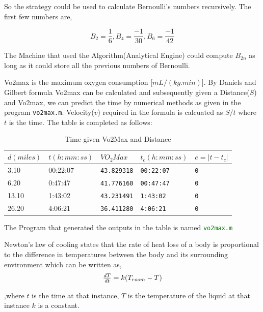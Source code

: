\documentclass[fleqn,letterpaper,12pt]{report}
\begin{document}
So the strategy could be used to calculate Bernoulli's numbers recursively. The first few numbers are,

$$ B_2 = \frac{1}{6}, B_4 = \frac{-1}{30}, B_6 = \frac{-1}{42}$$

The Machine that used the Algorithm(Analytical Engine) could compute $B_{2n}$ as long as it could store all the previous numbers of Bernoulli.\cite{lll}
%
\newpage
{}
{}
\problem
Vo2max is the maximum oxygen consumption [$mL/(kg.min)$]. By Daniels and Gilbert formula Vo2max can be calculated and subsequently given a Distance($S$) and Vo2max, we can predict the time by numerical methods as given in the program {\tt vo2max.m}. Velocity{($v$)} required in the formula is calcuated as {$S/t$} where {$ t $} is the time. The table is completed as follows:
\begin{table}[h]
\centering
\caption{Time given Vo2Max and Distance}
\label{my-label}
\begin{tabular}{|l|l|l|l|l|}
\hline
$d(miles)$ & $t(h:mm:ss)$ & $VO_2Max$  & $t_c(h:mm:ss)$ & $e = |t - t_c|$ \\ \hline \hline
3.10       & 00:22:07    & {\tt43.829318} & {\tt00:22:07}      & {\tt0}               \\ \hline
6.20       & 0:47:47     & {\tt41.776160} & {\tt00:47:47}      & {\tt0}               \\ \hline
13.10      & 1:43:02     & {\tt43.231491} & {\tt1:43:02}       & {\tt0}               \\ \hline
26.20      & 4:06:21     & {\tt36.411280} & {\tt4:06:21}       & {\tt0}               \\ \hline
\end{tabular}%
\end{table}

The Program that generated the outputs in the table is named \textcolor{Green}{\tt vo2max.m}
\newpage
{}
{}
\problem
Newton's law of cooling states that the rate of heat loss of a body is proportional to the difference in temperatures between the body and its surrounding environment which can be written as,
\begin{equation}
$$\frac{dT}{dt} = k(T_{room} -T)$$
\end{equation}

,where $t$ is the time at that instance, $T$ is the temperature of the liquid at that instance $k$ is a constant.
\end{document}
